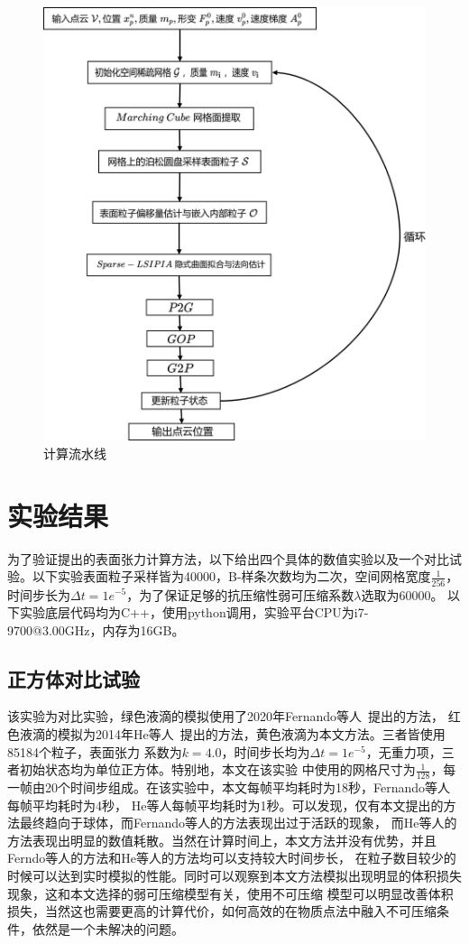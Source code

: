 \begin{figure}[htbp]
    \centering
    \includegraphics[scale=0.7]{./images/image17.png}
    \caption[计算流水线]{计算流水线}
    \label{fig: pipline}
\end{figure}

\section{实验结果}
为了验证提出的表面张力计算方法，以下给出四个具体的数值实验以及一个对比试验。以下实验表面粒子采样皆为40000，B-样条次数均为二次，空间网格宽度$\frac{1}{256}$，时间步长为$\Delta t = 1e^{-5}$，为了保证足够的抗压缩性弱可压缩系数$\lambda$选取为$60000$。
以下实验底层代码均为C++，使用python调用，实验平台CPU为i7-9700@3.00GHz，内存为16GB。

\subsection{正方体对比试验}
该实验为对比实验，绿色液滴的模拟使用了2020年Fernando等人~\cite{Zorrilla2020AcceleratingST}提出的方法，
红色液滴的模拟为2014年He等人~\cite{He2014}提出的方法，黄色液滴为本文方法。三者皆使用85184个粒子，表面张力
系数为$k = 4.0$，时间步长均为$\Delta t = 1e^{-5}$，无重力项，三者初始状态均为单位正方体。特别地，本文在该实验
中使用的网格尺寸为$\frac{1}{128}$，每一帧由20个时间步组成。在该实验中，本文每帧平均耗时为18秒，Fernando等人每帧平均耗时为4秒，
He等人每帧平均耗时为1秒。可以发现，仅有本文提出的方法最终趋向于球体，而Fernando等人的方法表现出过于活跃的现象，
而He等人的方法表现出明显的数值耗散。当然在计算时间上，本文方法并没有优势，并且Ferndo等人的方法和He等人的方法均可以支持较大时间步长，
在粒子数目较少的时候可以达到实时模拟的性能。同时可以观察到本文方法模拟出现明显的体积损失现象，这和本文选择的弱可压缩模型有关，使用不可压缩
模型可以明显改善体积损失，当然这也需要更高的计算代价，如何高效的在物质点法中融入不可压缩条件，依然是一个未解决的问题。

